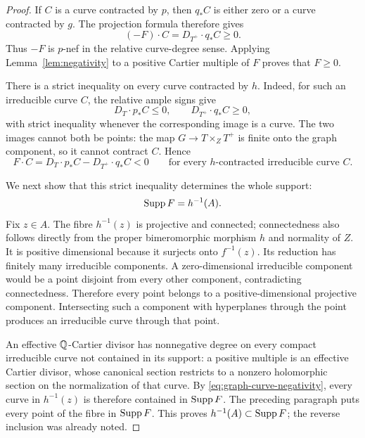 \begin{proof}
If $C$ is a curve contracted by $p$, then $q_*C$ is either zero or a
curve contracted by $g$.  The projection formula therefore gives
\[
 (-F)\cdot C=D_{T^+}\cdot q_*C\geq0.
\]
Thus $-F$ is $p$-nef in the relative curve-degree sense.  Applying
Lemma~\ref{lem:negativity} to a positive Cartier multiple of $F$
proves that $F\geq0$.

There is a strict inequality on every curve contracted by $h$.
Indeed, for such an irreducible curve $C$, the relative ample signs
give
\[
 D_T\cdot p_*C\leq0,\qquad
 D_{T^+}\cdot q_*C\geq0,
\]
with strict inequality whenever the corresponding image is a curve.
The two images cannot both be points: the map
$G\to T\times_ZT^+$ is finite onto the graph component, so it cannot
contract $C$.  Hence
\begin{equation}\label{eq:graph-curve-negativity}
 F\cdot C=D_T\cdot p_*C-D_{T^+}\cdot q_*C<0
 \qquad\text{for every $h$-contracted irreducible curve $C$.}
\end{equation}

We next show that this strict inequality determines the whole support:
\begin{equation}\label{eq:graph-support}
 \operatorname{Supp} F=h^{-1}(A).
\end{equation}
Fix $z\in A$.  The fibre $h^{-1}(z)$ is projective and connected;
connectedness also follows directly from the proper bimeromorphic
morphism $h$ and normality of $Z$.  It is positive dimensional because
it surjects onto $f^{-1}(z)$.  Its reduction has finitely many
irreducible components.  A zero-dimensional irreducible component
would be a point disjoint from every other component, contradicting
connectedness.  Therefore every point belongs to a positive-dimensional
projective component.  Intersecting such a component with hyperplanes
through the point produces an irreducible curve through that point.

An effective $\mathbb Q$-Cartier divisor has nonnegative degree on every
compact irreducible curve not contained in its support: a positive
multiple is an effective Cartier divisor, whose canonical section
restricts to a nonzero holomorphic section on the normalization of
that curve.  By \eqref{eq:graph-curve-negativity}, every curve in
$h^{-1}(z)$ is therefore contained in $\operatorname{Supp} F$.  The preceding
paragraph puts every point of the fibre in $\operatorname{Supp} F$.  This proves
$h^{-1}(A)\subset\operatorname{Supp} F$; the reverse inclusion was already noted.


\end{proof}

